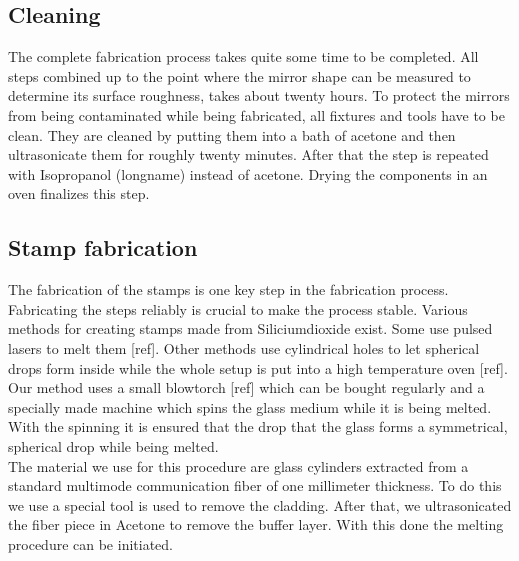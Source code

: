 \subsection{Cleaning}
The complete fabrication process takes quite some time to be completed. All steps combined up to the point where the mirror shape can be measured to determine its surface roughness, takes about twenty hours. To protect the mirrors from being contaminated while being fabricated, all fixtures and tools have to be clean. They are cleaned by putting them into a bath of acetone and then ultrasonicate them for roughly twenty minutes. After that the step is repeated with Isopropanol (longname) instead of acetone. Drying the components in an oven finalizes this step.
\subsection{Stamp fabrication}
The fabrication of the stamps is one key step in the fabrication process. Fabricating the steps reliably is crucial to make the process stable. Various methods for creating stamps made from Siliciumdioxide exist. Some use pulsed lasers to melt them [ref]. Other methods use cylindrical holes to let spherical drops form inside while the whole setup is put into a high temperature oven [ref]. Our method uses a small blowtorch [ref] which can be bought regularly and a specially made machine which spins the glass medium while it is being melted. With the spinning it is ensured that the drop that the glass forms a symmetrical, spherical drop while being melted.\\
The material we use for this procedure are glass cylinders extracted from a standard multimode communication fiber of one millimeter thickness. To do this we use a special tool is used to remove the cladding. After that, we ultrasonicated the fiber piece in Acetone to remove the buffer layer. With this done the melting procedure can be initiated.
